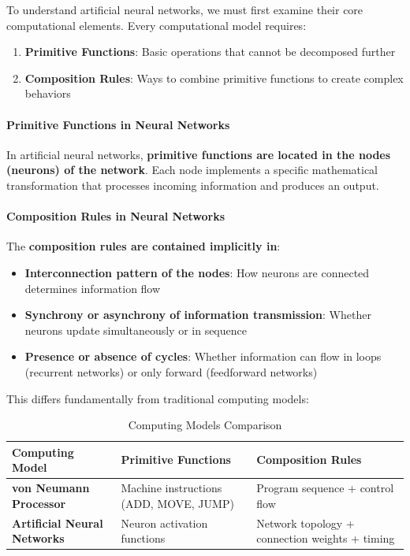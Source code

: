 To understand artificial neural networks, we must first examine their core computational elements. Every computational model requires:

\begin{enumerate}
\item \textbf{Primitive Functions}: Basic operations that cannot be decomposed further
\item \textbf{Composition Rules}: Ways to combine primitive functions to create complex behaviors
\end{enumerate}

\paragraph{Primitive Functions in Neural Networks}

In artificial neural networks, \textbf{primitive functions are located in the nodes (neurons) of the network}. Each node implements a specific mathematical transformation that processes incoming information and produces an output.

\paragraph{Composition Rules in Neural Networks}

The \textbf{composition rules are contained implicitly in}:

\begin{itemize}
\item \textbf{Interconnection pattern of the nodes}: How neurons are connected determines information flow
\item \textbf{Synchrony or asynchrony of information transmission}: Whether neurons update simultaneously or in sequence
\item \textbf{Presence or absence of cycles}: Whether information can flow in loops (recurrent networks) or only forward (feedforward networks)
\end{itemize}

This differs fundamentally from traditional computing models:

\begin{table}[h!]
\centering
\begin{tabular}{|l|l|l|}
\hline
\textbf{Computing Model} & \textbf{Primitive Functions} & \textbf{Composition Rules} \\
\hline
\textbf{von Neumann Processor} & Machine instructions (ADD, MOVE, JUMP) & Program sequence + control flow \\
\hline
\textbf{Artificial Neural Networks} & Neuron activation functions & Network topology + connection weights + timing \\
\hline
\end{tabular}
\caption{Computing Models Comparison}
\end{table}

